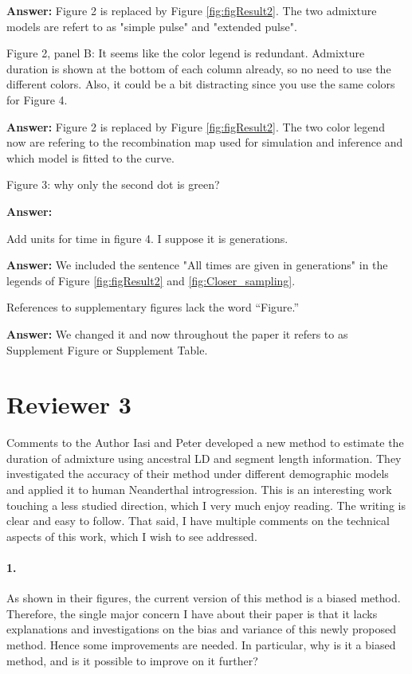 \documentclass[11pt]{article}
\let\oldparagraph\paragraph
\renewcommand{\paragraph}[1]{\oldparagraph{#1}\mbox{}}
\begin{document}
\textbf{Answer:} Figure 2 is replaced by Figure \ref{fig:figResult2}. The two admixture models are refert to as "simple pulse" and "extended pulse".


Figure 2, panel B: It seems like the color legend is redundant. Admixture duration is shown at the bottom of each column already, so no need to use the different colors. Also, it could be a bit distracting since you use the same colors for Figure 4. 

\textbf{Answer:} Figure 2 is replaced by Figure \ref{fig:figResult2}. The two color legend now are refering to the recombination map used for simulation and inference and which model is fitted to the curve.

Figure 3: why only the second dot is green?

\textbf{Answer:} 

Add units for time in figure 4. I suppose it is generations.

\textbf{Answer:} We included the sentence "All times are given in generations" in the legends of Figure \ref{fig:figResult2} and \ref{fig:Closer_sampling}.

References to supplementary figures lack the word “Figure.” 

\textbf{Answer:} We changed it and now throughout the paper it refers to as Supplement Figure or Supplement Table.

\section{Reviewer 3}\label{Reviewer 3}

Comments to the Author
Iasi and Peter developed a new method to estimate the duration of admixture using ancestral LD and segment length information. They investigated the accuracy of their method under different demographic models and applied it to human Neanderthal introgression. This is an interesting work touching a less studied direction, which I very much enjoy reading. The writing is clear and easy to follow. That said, I have multiple comments on the technical aspects of this work, which I wish to see addressed. 

\paragraph{1.}
As shown in their figures, the current version of this method is a biased method. Therefore, the single major concern I have about their paper is that it lacks explanations and investigations on the bias and variance of this newly proposed method. Hence some improvements are needed. In particular, why is it a biased method, and is it possible to improve on it further?
\end{document}
